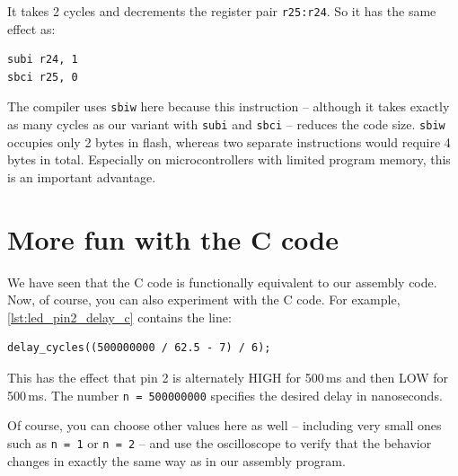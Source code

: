 \documentclass[a4paper,12pt]{article}
\begin{document}
\begin{enumerate}
\noindent
It takes 2 cycles and decrements the register pair \texttt{r25:r24}.
So it has the same effect as:
\begin{lstlisting}[language={[x86masm]Assembler}]
subi r24, 1
sbci r25, 0
\end{lstlisting}
The compiler uses \texttt{sbiw} here because this instruction – although it
takes exactly as many cycles as our variant with \texttt{subi} and
\texttt{sbci} – reduces the code size. \texttt{sbiw} occupies only 2 bytes
in flash, whereas two separate instructions would require 4 bytes in total.
Especially on microcontrollers with limited program memory, this is an
important advantage.
\end{enumerate}


\section{More fun with the C code}

We have seen that the C code is functionally equivalent to our assembly code.
Now, of course, you can also experiment with the C code.
For example, \autoref{lst:led_pin2_delay_c} contains the line:

\begin{lstlisting}
delay_cycles((500000000 / 62.5 - 7) / 6);
\end{lstlisting}

This has the effect that pin 2 is alternately HIGH for 500\,ms and then LOW
for 500\,ms. The number \texttt{n = 500000000} specifies the desired delay
in nanoseconds.

Of course, you can choose other values here as well – including very small
ones such as \texttt{n = 1} or \texttt{n = 2} – and use the oscilloscope to
verify that the behavior changes in exactly the same way as in our assembly
program.
\end{document}
